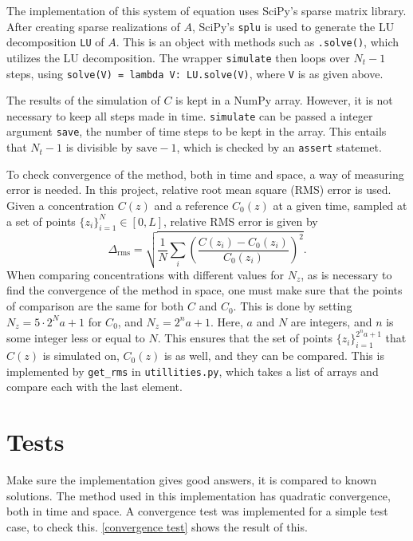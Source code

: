 \documentclass{article}
\begin{document}
    The implementation of this system of equation uses SciPy's sparse matrix library. After creating sparse realizations of $A$, SciPy's \verb|splu| is used to generate the LU decomposition \verb|LU| of $A$. This is an object with methods such as \verb|.solve()|, which utilizes the LU decomposition. The wrapper \verb|simulate| then loops over $N_t-1$ steps, using \verb|solve(V) = lambda V: LU.solve(V)|, where \verb|V| is as given above.

    The results of the simulation of $C$ is kept in a NumPy array. However, it is not necessary to keep all steps made in time. \verb|simulate| can be passed a integer argument \verb|save|, the number of time steps to be kept in the array. This entails that $N_t-1$ is divisible by $\mathrm{save}-1$, which is checked by an \verb|assert| statemet.

    To check convergence of the method, both in time and space, a way of measuring error is needed. In this project, relative root mean square (RMS) error is used. Given a concentration $C(z)$ and a reference $C_0(z)$ at a given time, sampled at a set of points $\{z_i\}_{i=1}^N \in [0, L]$, relative RMS error is given by
    \begin{equation*}
        \Delta_\mathrm{rms} = \sqrt{\frac{1}{N}\sum_i \left(\frac{C(z_i) - C_0(z_i)}{C_0(z_i)}\right)^2}.
    \end{equation*}
    When comparing concentrations with different values for $N_z$, as is necessary to find the convergence of the method in space, one must make sure that the points of comparison are the same for both $C$ and $C_0$. This is done by setting $N_z = 5\cdot 2^Na + 1$ for $C_0$, and $N_z = 2^n a + 1$. Here, $a$ and $N$ are integers, and $n$ is some integer less or equal to $N$. This ensures that the set of points $\{z_i\}_{i=1}^{2^na+1}$ that $C(z)$ is simulated on, $C_0(z)$ is as well, and they can be compared. This is implemented by \verb|get_rms| in \verb|utillities.py|, which takes a list of arrays and compare each with the last element. 


    \section*{Tests}
    Make sure the implementation gives good answers, it is compared to known solutions. The method used in this implementation has quadratic convergence, both in time and space. A convergence test was implemented for a simple test case, to check this. \autoref{convergence test} shows the result of this. 
\end{document}
